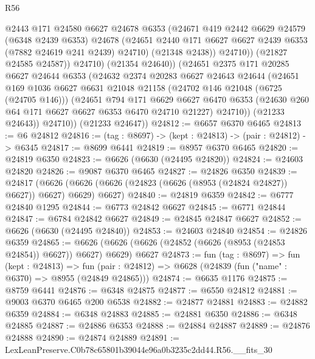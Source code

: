 \begin{lexlean}{R56}
\begin{coremodule}
                  @2443
                  @171
                  @24580
                  @6627
                  @24678
                  @6353
                  (@24671
                    @419
                    @2442
                    @6629
                    @24579
                    (@6348 @2439 @6353)
                    @24678
                    (@24651 @2440 @171 @6627 @6627 @2439 @6353 (@7882 @24619 @241 @2439) @24710)
                    (@21348 @2438))
                  @24710))
              (@21827 @24585 @24587))
            @24710)
          (@21354 @24640))
        (@24651
          @2375
          @171
          @20285
          @6627
          @24644
          @6353
          (@24632
            @2374
            @20283
            @6627
            @24643
            @24644
            (@24651
              @169
              @1036
              @6627
              @6631
              @21048
              @21158
              (@24702 @146 @21048 (@6725 (@24705 @146)))
              (@24651
                @794
                @171
                @6629
                @6627
                @6470
                @6353
                (@24630 @260 @64 @171 @6627 @6627 @6353 @6470 @24710 @21227)
                @24710))
            (@21233 @24643))
          @24710))
      (@21233 @24647))
@24812 := @6657 @6370 @6465
@24813 := @6 @24812
@24816 := (tag : @8697) -> (kept : @24813) -> (pair : @24812) -> @6345
@24817 := @8699 @6441
@24819 := @8957 @6370 @6465
@24820 := @24819 @6350
@24823 := @6626 (@6630 (@24495 @24820))
@24824 := @24603 @24820
@24826 := @9087 @6370 @6465
@24827 := @24826 @6350
@24839 := @24817
    (@6626 (@6626 (@6626 (@24823 (@6626 (@8953 (@24824 @24827)) @6627)) @6627) @6629) @6627)
@24840 := @24819 @6359
@24842 := @6777 @24840 @1295
@24844 := @6773 @24842 @6627
@24845 := @6771 @24844
@24847 := @6784 @24842 @6627
@24849 := @24845 @24847 @6627
@24852 := @6626 (@6630 (@24495 @24840))
@24853 := @24603 @24840
@24854 := @24826 @6359
@24865 := @6626 (@6626 (@6626 (@24852 (@6626 (@8953 (@24853 @24854)) @6627)) @6627) @6629) @6627
@24873 := fun (tag : @8697) =>
  fun (kept : @24813) =>
  fun (pair : @24812) => @6628 (@24839 (fun ("name" : @6370) => @8955 (@24849 @24865)))
@24874 := @6635 @1176
@24875 := @8759 @6441
@24876 := @6348 @24875
@24877 := @6550 @24812
@24881 := @9003 @6370 @6465 @200 @6538
@24882 := @24877 @24881
@24883 := @24882 @6359
@24884 := @6348 @24883
@24885 := @24881 @6350
@24886 := @6348 @24885
@24887 := @24886 @6353
@24888 := @24884 @24887
@24889 := @24876 @24888
@24890 := @24874 @24889
@24891 := LexLeanPreserve.C0b78c65801b39044e96a0b3235c2dd44.R56.__fits_30

\end{coremodule}
\end{lexlean}
